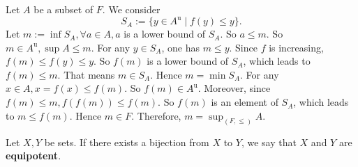 \begin{proofenv}
    Let $A$ be a subset of $F$. We consider 
    $$S_A:=\{y\in A^\mathrm{u}\mid f(y)\le y\}.$$
    Let $m:=\inf S_A, \forall a\in A, a$ is a lower bound of $S_A$. So $a\le m$. So $m\in A^\mathrm{u}, \sup A\le m$. For any $y\in S_A$, one has $m\le y$. Since $f$ is increasing,  $f(m)\le f(y)\le y$. So $f(m)$ is a lower bound of $S_A$,  which leads to $f(m)\le m$. That means $m\in S_A$. Hence $m=\min S_A$. For any $x\in A, x=f(x)\le f(m)$. So $f(m)\in A^\mathrm{u}$. Moreover,  since $f(m)\le m , f(f(m))\le f(m)$. So $f(m)$ is an element of $S_A$,  which leads to $m\le f(m)$. Hence $m\in F$. Therefore,  $m=\sup_{(F, \le)}A$.
\end{proofenv}
\begin{definitionenv}
    Let $X, Y$ be sets. If there exists a bijection from $X$ to $Y$,  we say that $X$ and $Y$ are \textbf{equipotent}.
\end{definitionenv}



